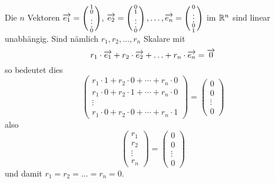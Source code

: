 \begin{beispiel}\label{lin_un_standard} Die $n$ Vektoren  $\overrightarrow{e_1} = 
\left( \begin{smallmatrix} 1 \\ 0 \\ \vdots \\ 0
\end{smallmatrix} \right)$, $\overrightarrow{e_2} = \left( \begin{smallmatrix} 0 \\ 1 \\ \vdots \\ 0 
\end{smallmatrix} \right), \ldots , \overrightarrow{e_n} = \left( \begin{smallmatrix} 0 \\ \vdots \\ 0 \\ 1 
\end{smallmatrix} \right)$ im $\mathbb R^n$ sind linear unabhängig. Sind nämlich $r_1, r_2, \ldots, r_n$ 
Skalare mit 
  	$$  r_1 \cdot \overrightarrow{e_1} + r_2 \cdot  \overrightarrow{e_2} + \ldots +
      	r_n \cdot \overrightarrow{e_n} =  \overrightarrow{0} $$
so bedeutet dies
  	$$ \left( \begin{matrix} r_1 \cdot 1 + r_2 \cdot 0 + \cdots + r_n \cdot 0 \\ 
     	r_1 \cdot 0 + r_2 \cdot 1 + \cdots + r_n \cdot 0 \\ \vdots \\ 
     	r_1 \cdot 0 + r_2 \cdot 0 + \cdots + r_n \cdot 1 \end{matrix} \right)
    	= \left( \begin{matrix} 0 \\ 0 \\ \vdots \\ 0 \end{matrix} \right) $$
also 
  	$$ \left( \begin{matrix} r_1  \\ r_2 \\ \vdots \\  r_n  \end{matrix} \right)
    	= \left( \begin{matrix} 0 \\ 0 \\ \vdots \\ 0 \end{matrix} \right) $$
und damit $r_1 = r_2 = \ldots = r_n = 0$.
\end{beispiel} 

